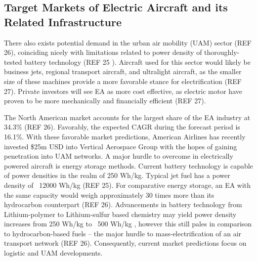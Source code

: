 \documentclass[../main.tex]{subfiles}
\begin{document}
\subsection{Target Markets of Electric Aircraft and its Related Infrastructure}
There also exists potential demand in the urban air mobility (UAM) sector (REF 26), coinciding nicely with limitations related to power density of thoroughly-tested battery technology (REF 25 ). Aircraft used for this sector would likely be business jets, regional transport aircraft, and ultralight aircraft, as the smaller size of these machines provide a more favorable stance for electrification (REF 27). Private investors will see EA as more cost effective, as electric motor have proven to be more mechanically and financially efficient (REF 27).\par
The North American market accounts for the largest share of the EA industry at 34.3\% (REF 26). Favorably, the expected CAGR during the forecast period is 16.1\%. With these favorable market predictions, American Airlines has recently invested \$25m USD into Vertical Aerospace Group with the hopes of gaining penetration into UAM networks.  A major hurdle to overcome in electrically powered aircraft is energy storage methods. Current battery technology is capable of power densities in the realm of 250  Wh/kg. Typical jet fuel has a power density of ~12000 Wh/kg (REF 25). For comparative energy storage, an EA with the same capacity would weigh approximately 30 times more than its hydrocarbon counterpart (REF 26).  Advancements in battery technology from Lithium-polymer to Lithium-sulfur based chemistry may yield power density increases from 250 Wh/kg to ~500 Wh/kg , however this still pales in comparison to hydrocarbon-based fuels – the major hurdle to mass-electrification of an air transport network (REF 26). Consequently, current market predictions focus on logistic and UAM developments.\par
\end{document}
